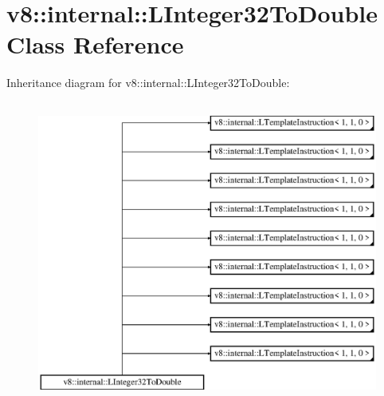 \hypertarget{classv8_1_1internal_1_1_l_integer32_to_double}{}\section{v8\+:\+:internal\+:\+:L\+Integer32\+To\+Double Class Reference}
\label{classv8_1_1internal_1_1_l_integer32_to_double}
Inheritance diagram for v8\+:\+:internal\+:\+:L\+Integer32\+To\+Double\+:\begin{figure}[H]
\begin{center}
\leavevmode
\includegraphics[height=10.000000cm]{classv8_1_1internal_1_1_l_integer32_to_double}
\end{center}
\end{figure}
